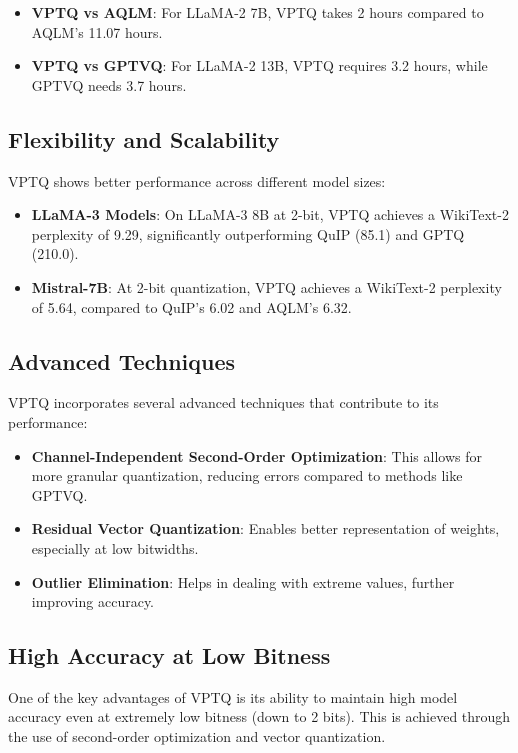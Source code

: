 \documentclass{article}
\begin{document}
\begin{itemize}
    \item \textbf{VPTQ vs AQLM}: For LLaMA-2 7B, VPTQ takes 2 hours compared to AQLM's 11.07 hours.
    \item \textbf{VPTQ vs GPTVQ}: For LLaMA-2 13B, VPTQ requires 3.2 hours, while GPTVQ needs 3.7 hours.
\end{itemize}

\subsection{Flexibility and Scalability}
VPTQ shows better performance across different model sizes:

\begin{itemize}
    \item \textbf{LLaMA-3 Models}: On LLaMA-3 8B at 2-bit, VPTQ achieves a WikiText-2 perplexity of 9.29, significantly outperforming QuIP (85.1) and GPTQ (210.0).
    \item \textbf{Mistral-7B}: At 2-bit quantization, VPTQ achieves a WikiText-2 perplexity of 5.64, compared to QuIP's 6.02 and AQLM's 6.32.
\end{itemize}

\subsection{Advanced Techniques}
VPTQ incorporates several advanced techniques that contribute to its performance:

\begin{itemize}
    \item \textbf{Channel-Independent Second-Order Optimization}: This allows for more granular quantization, reducing errors compared to methods like GPTVQ.
    \item \textbf{Residual Vector Quantization}: Enables better representation of weights, especially at low bitwidths.
    \item \textbf{Outlier Elimination}: Helps in dealing with extreme values, further improving accuracy.
\end{itemize}

\subsection{High Accuracy at Low Bitness}
One of the key advantages of VPTQ is its ability to maintain high model accuracy even at extremely low bitness (down to 2 bits). This is achieved through the use of second-order optimization and vector quantization.
\end{document}

